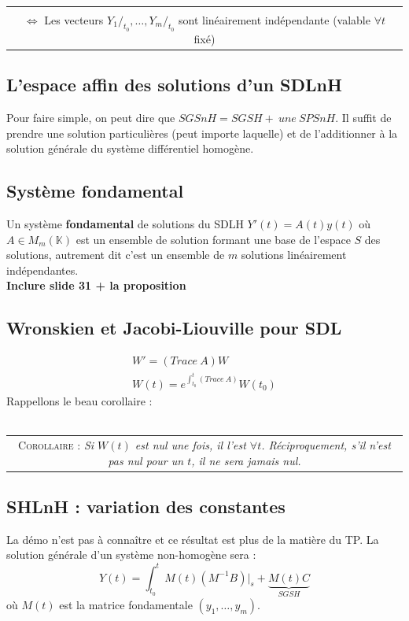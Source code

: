 \documentclass	[11pt, a4paper, openany]{book}
\newcommand{\corollaire}[1]{\ \\\begin{tabular}{|c}
\begin{minipage}{\textwidth}
  \textsc{Corollaire : } \textit{#1}
\end{minipage}
\end{tabular}}
\begin{document}
	\corollaire{Les $m$ solution $Y_1, \dots, Y_m$ sont linéairement indépendantes\\
		$\Leftrightarrow$ Les vecteurs $Y_1/_{t_0}, \dots, Y_m/_{t_0}$ sont linéairement indépendante (valable $\forall t$ fixé)}
	 
	\subsection{L'espace affin des solutions d'un SDLnH}
	Pour faire simple, on peut dire que $SGSnH = SGSH +\ une\ SPSnH$. Il suffit de prendre une solution particulières (peut importe laquelle) et de l'additionner à la solution générale du système différentiel homogène.
	
	\subsection{Système fondamental}
	Un système \textbf{fondamental} de solutions du SDLH $Y'(t) = A(t)y(t)$ où $A \in M_m(\mathbb{K})$ est un ensemble de solution formant une base de l'espace $S$ des solutions, autrement dit c'est un ensemble de $m$ solutions linéairement indépendantes.\\
	\textbf{Inclure slide 31  + la proposition}
	
	\subsection{Wronskien et Jacobi-Liouville pour SDL}
	\begin{eqnarray}
		W' = (Trace\ A)W\\
		W(t) = e^{\int_{t_0}^t (Trace\ A)}W(t_0)
	\end{eqnarray}
	Rappellons le beau corollaire :\\
	\corollaire{Si $W(t)$ est nul une fois, il l'est $\forall t$. Réciproquement, s'il n'est pas nul pour un $t$, il ne sera jamais nul.}
	
	\subsection{SHLnH : variation des constantes}
	La démo n'est pas à connaître et ce résultat est plus de la matière du TP. La solution générale d'un système non-homogène sera :
	\begin{equation}
		Y(t) = \int_{t_0}^t M(t)(M^{-1}B)|_s + \underbrace{M(t)C}_{SGSH}
	\end{equation}
	où $M(t)$ est la matrice fondamentale $(y_1,\dots,y_m)$.
	
\end{document}
